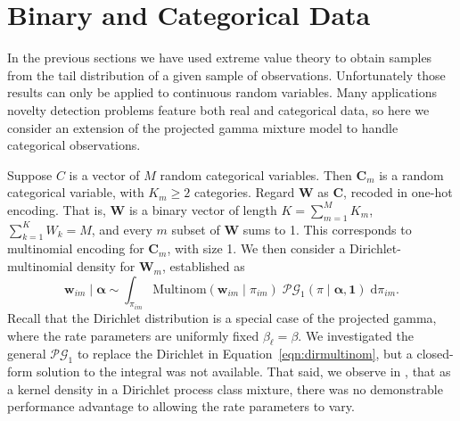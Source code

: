 \section{Binary and Categorical Data\label{sec:categorical}}
In the previous sections we have used extreme value theory to obtain samples
    from the tail distribution of a given sample of observations. Unfortunately 
    those results can only be applied to continuous random variables.  Many 
    applications novelty detection problems feature both real and categorical 
    data, so here we consider an extension of the projected gamma mixture model 
    to handle categorical observations. 

Suppose $C$ is a vector of $M$ random categorical variables.  Then $\bm{C}_{m}$ 
    is a random categorical variable, with $K_{m} \geq 2$ categories. Regard 
    $\bm{W}$ as $\bm{C}$, recoded in one-hot encoding.  That is, $\bm{W}$ is a 
    binary vector of length $K = \sum_{m = 1}^M K_{m}$, 
    $\sum_{k = 1}^K W_k = M$, and every $m$ subset of $\bm{W}$ sums to 1.  This 
    corresponds to multinomial encoding for $\bm{C}_m$, with size 1. We then 
    consider a Dirichlet-multinomial density for $\bm{W}_m$, established as 
    \begin{equation}
        \label{eqn:dirmultinom}
        \bm{w}_{im}\mid\bm{\alpha} 
        \sim 
        \int_{\pi_{im}} 
        \text{Multinom}(\bm{w}_{im}\mid\pi_{im})\;
        \mathcal{PG}_1(\pi\mid\bm{\alpha},\bm{1})\;\text{d}\pi_{im}.
    \end{equation}
    Recall that the Dirichlet distribution is a special case of the projected 
    gamma, where the rate parameters are uniformly fixed $\beta_{\ell} = \beta$.  
    We investigated the general $\mathcal{PG}_1$ to replace the Dirichlet in 
    Equation~\ref{eqn:dirmultinom}, but a closed-form solution to the integral 
    was not available.  That said, we observe in \cite{trubey:pg}, that as a 
    kernel density in a Dirichlet process class mixture, there was no 
    demonstrable performance advantage to allowing the rate parameters to vary.
 
